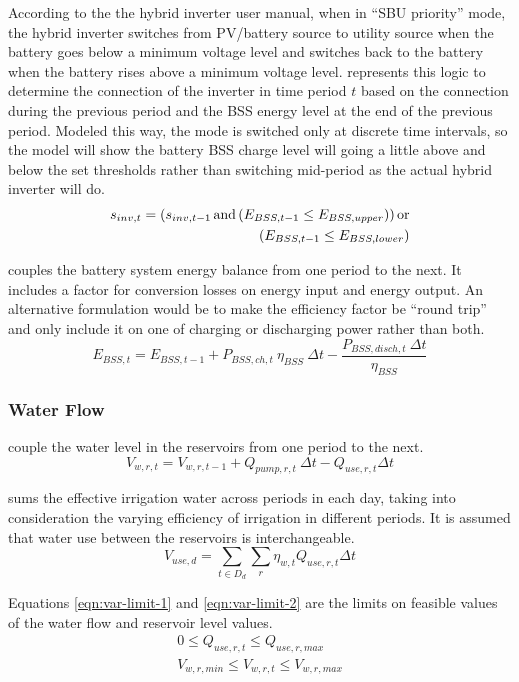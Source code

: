 According to the the hybrid inverter user manual\cite{Growatt_manual}, when in ``SBU priority'' mode, the hybrid inverter switches from PV/battery source to utility source when the battery goes below a minimum voltage level and switches back to the battery when the battery rises above a minimum voltage level.  represents this logic to determine the connection of the inverter in time period $t$ based on the connection during the previous period and the BSS energy level at the end of the previous period. 
Modeled this way, the mode is switched only at discrete time intervals, so the model will show the battery BSS charge level will going a little above and below the set thresholds rather than switching mid-period as the actual hybrid inverter will do.
%
\begin{equation}
\label{eqn:inverter-mode}
\begin{split}
s_{inv,t} = \left(s_{inv,t-1} \operatorname{and} \left(E_{BSS,t-1} \le E_{BSS,upper} \right) \right)
\operatorname{or}
\\
\left( E_{BSS,t-1} \le E_{BSS,lower} \right)
\end{split}
\end{equation}

 couples the battery system energy balance from one period to the next. It includes a factor for conversion losses on energy input and energy output. An alternative formulation would be to make the efficiency factor be ``round trip'' and only include it on one of charging or discharging power rather than both.
%
\begin{equation}
\label{eqn:BSS-balance}
E_{BSS,t} = E_{BSS,t-1} + P_{BSS,ch,t} \ \eta_{BSS} \ \Delta t - \frac{P_{BSS,disch,t} \ \Delta t}{\eta_{BSS}}
\end{equation}

\subsubsection{Water Flow}

 couple the water level in the reservoirs from one period to the next.
%
\begin{equation}
\label{eqn:water-balance}
V_{w,r,t} = V_{w,r,t-1} + Q_{pump,r,t} \ \Delta t - Q_{use,r,t} \Delta t
\end{equation}

 sums the effective irrigation water across periods in each day, taking into consideration the varying efficiency of irrigation in different periods.
It is assumed that water use between the reservoirs is interchangeable.
%
\begin{equation}
\label{eqn:total-water}
V_{use,d} = \sum_{t \in D_d}  \sum_{r} \eta_{w,t} Q_{use,r,t} \Delta t
\end{equation}

Equations \ref{eqn:var-limit-1} and \ref{eqn:var-limit-2} are the limits on feasible values of the water flow and reservoir level values.
%
\begin{gather}
\label{eqn:var-limit-1}
0 \le Q_{use,r,t} \le Q_{use,r,max} \\
\label{eqn:var-limit-2}
V_{w,r,min} \le V_{w,r,t} \le V_{w,r,max}
\end{gather}



